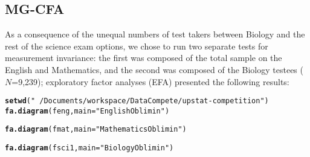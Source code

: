 \documentclass{article}\usepackage[]{graphicx}\usepackage[]{color}
\makeatletter
\newcommand{\hlstr}[1]{\textcolor[rgb]{0.192,0.494,0.8}{#1}}%
\newcommand{\hlstd}[1]{\textcolor[rgb]{0.345,0.345,0.345}{#1}}%
\newcommand{\hlkwc}[1]{\textcolor[rgb]{0.333,0.667,0.333}{#1}}%
\newcommand{\hlkwd}[1]{\textcolor[rgb]{0.737,0.353,0.396}{\textbf{#1}}}%
\newenvironment{kframe}{%
 \def\at@end@of@kframe{}%
 \ifinner\ifhmode%
  \def\at@end@of@kframe{\end{minipage}}%
  \begin{minipage}{\columnwidth}%
 \fi\fi%
 \def\FrameCommand##1{\hskip\@totalleftmargin \hskip-\fboxsep
 \colorbox{shadecolor}{##1}\hskip-\fboxsep
     \hskip-\linewidth \hskip-\@totalleftmargin \hskip\columnwidth}%
 \MakeFramed {\advance\hsize-\width
   \@totalleftmargin\z@ \linewidth\hsize
   \@setminipage}}%
 {\par\unskip\endMakeFramed%
 \at@end@of@kframe}
\newenvironment{knitrout}{}{} %
\makeatother
\begin{document}
\subsection{MG-CFA}
As a consequence of the unequal numbers of test takers between Biology and the rest of the science exam options, we chose to run two separate tests for measurement invariance: the first was composed of the total sample on the English and Mathematics, and the second was composed of the Biology testees ($N$=9,239); exploratory factor analyses (EFA) presented the following results:
\begin{knitrout}
\color{fgcolor}\begin{kframe}
\begin{alltt}
\hlkwd{setwd}\hlstd{(}\hlstr{"~/Documents/workspace/DataCompete/upstat-competition"}\hlstd{)}
\hlkwd{fa.diagram}\hlstd{(feng,} \hlkwc{main} \hlstd{=} \hlstr{"English Oblimin"}\hlstd{)}
\end{alltt}


{\ttfamily\noindent\bfseries{}}\end{kframe}
\end{knitrout}


\begin{knitrout}
\color{fgcolor}\begin{kframe}
\begin{alltt}
\hlkwd{fa.diagram}\hlstd{(fmat,} \hlkwc{main} \hlstd{=} \hlstr{"Mathematics Oblimin"}\hlstd{)}
\end{alltt}


{\ttfamily\noindent\bfseries{}}\end{kframe}
\end{knitrout}


\begin{knitrout}
\color{fgcolor}\begin{kframe}
\begin{alltt}
\hlkwd{fa.diagram}\hlstd{(fsci1,} \hlkwc{main} \hlstd{=} \hlstr{"Biology Oblimin"}\hlstd{)}
\end{alltt}


{\ttfamily\noindent\bfseries{}}\end{kframe}
\end{knitrout}
\end{document}
